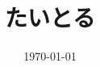 \documentclass[dvipdfmx]{jsreport}
\begin{document}
\title{たいとる}
\date{\today}
\author{}
\maketitle



\newpage


\end{document}
